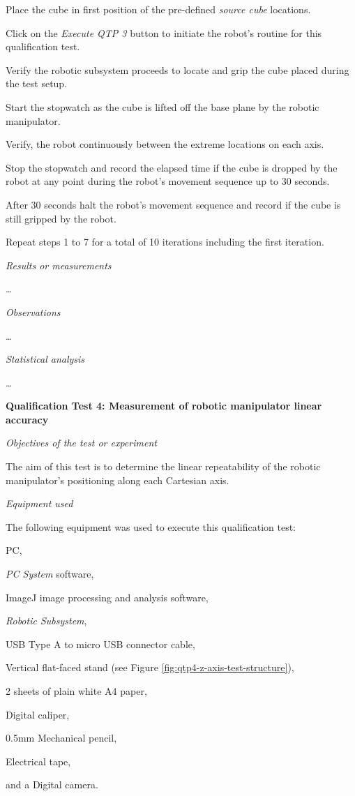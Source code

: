 \begin{compactenum}
	\item Place the cube in first position of the pre-defined \textit{source cube} locations.
	\item Click on the \textit{Execute QTP 3} button to initiate the robot's routine for this qualification test.
	\item Verify the robotic subsystem proceeds to locate and grip the cube placed during the test setup.
	\item Start the stopwatch as the cube is lifted off the base plane by the robotic manipulator.
	\item Verify, the robot continuously between the extreme locations on each axis.
	\item Stop the stopwatch and record the elapsed time if the cube is dropped by the robot at any point during the robot's movement sequence up to 30 seconds.
	\item After 30 seconds halt the robot's movement sequence and record if the cube is still gripped by the robot.
	\item Repeat steps 1 to 7 for a total of 10 iterations including the first iteration.
\end{compactenum}

\textit{Results or measurements}

\ldots

\textit{Observations}

\ldots

\textit{Statistical analysis}

\ldots

\textbf{Qualification Test 4: Measurement of robotic manipulator linear accuracy}

\textit{Objectives of the test or experiment}

The aim of this test is to determine the linear repeatability of the robotic manipulator's positioning along each Cartesian axis.

\textit{Equipment used}

The following equipment was used to execute this qualification test:

\begin{compactitem}
	\item PC,
	\item \textit{PC System} software,
	\item ImageJ image processing and analysis software,
	\item \textit{Robotic Subsystem},
	\item USB Type A to micro USB connector cable,
	\item Vertical flat-faced stand (see Figure \ref{fig:qtp4-z-axis-test-structure}),
	\item 2 sheets of plain white A4 paper,
	\item Digital caliper,
	\item 0.5mm Mechanical pencil,
	\item Electrical tape,
	\item and a Digital camera.
\end{compactitem}

